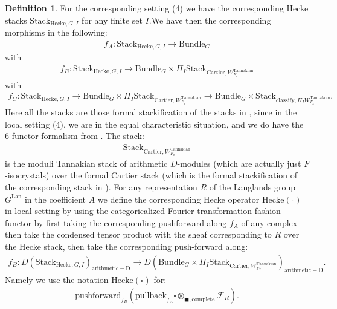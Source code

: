 \documentclass[12pt]{book}
\theoremstyle{definition}
\newtheorem{definition}{Definition}
\begin{document}
\begin{definition}
For the corresponding setting (4) we have the corresponding Hecke stacks $\mathrm{Stack}_{\mathrm{Hecke},G,I}$ for any finite set $I$.We have then the corresponding morphisms in the following:
\begin{align}
f_A: \mathrm{Stack}_{\mathrm{Hecke},G,I} \rightarrow \mathrm{Bundle}_{G}
\end{align}
with
\begin{align}
f_B: \mathrm{Stack}_{\mathrm{Hecke},G,I} \rightarrow \mathrm{Bundle}_{G}\times \Pi_I \mathrm{Stack}_{\mathrm{Cartier},W^\mathrm{Tannakian}_{F_x}}
\end{align}
with
\begin{align}
f_C: \mathrm{Stack}_{\mathrm{Hecke},G,I} \rightarrow \mathrm{Bundle}_{G}\times \Pi_I \mathrm{Stack}_{\mathrm{Cartier},W^\mathrm{Tannakian}_{F_x}}\rightarrow \mathrm{Bundle}_{G}\times \mathrm{Stack}_{\mathrm{classify},\Pi_I W^\mathrm{Tannakian}_{F_x}}.
\end{align}
Here all the stacks are those formal stackification of the stacks in \cite{FS}, since in the local setting (4), we are in the equal characteristic situation, and we do have the 6-functor formalism from \cite{AI}. The stack:
\begin{align}
\mathrm{Stack}_{\mathrm{Cartier},W^\mathrm{Tannakian}_{F_x}}
\end{align}
is the moduli Tannakian stack of arithmetic $D$-modules (which are actually just $F$-isocrystals) over the formal Cartier stack (which is the formal stackification of the corresponding stack in \cite{FS}). 
For any representation $R$ of the Langlands group $G^\mathrm{Lan}$ in the coefficient $A$ we define the corresponding Hecke operator $\mathrm{Hecke}(\square)$ in local setting by using the categoricalized Fourier-transformation fashion functor by first taking the corresponding pushforward along $f_A$ of any complex then take the condensed tensor product with the sheaf corresponding to $R$ over the Hecke stack, then take the corresponding push-forward along:
\begin{align}
f_B: D(\mathrm{Stack}_{\mathrm{Hecke},G,I})_{\mathrm{arithmetic-D}} \rightarrow D(\mathrm{Bundle}_{G}\times \Pi_I \mathrm{Stack}_{\mathrm{Cartier},W^\mathrm{Tannakian}_{F_x}})_{\mathrm{arithmetic-D}}.
\end{align}
Namely we use the notation $\mathrm{Hecke}(\square)$ for:
\begin{align}
\mathrm{pushforward}_{f_B}(\mathrm{pullback}_{f_A}\square\otimes_{\blacksquare,\mathrm{complete}}\mathcal{F}_R).
\end{align}

\end{definition}
\end{document}
